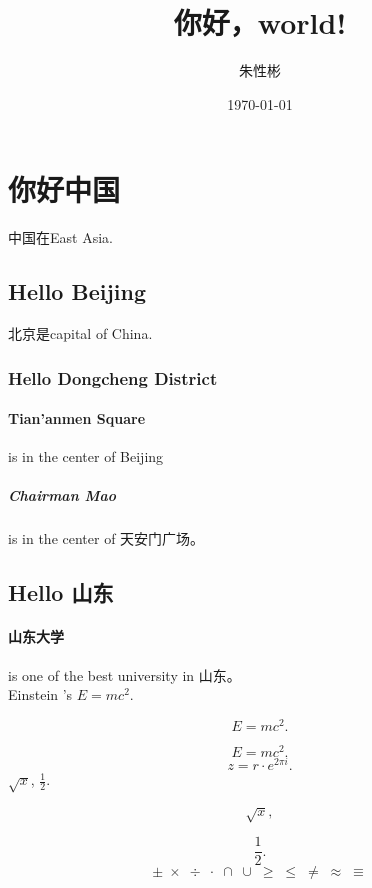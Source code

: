 \documentclass[UTF8]{ctexart}
\title{你好，world!}
\author{朱性彬}
\date{\today}
\begin{document}
\maketitle
\tableofcontents
\section{你好中国}%
中国在East Asia.
	\subsection{Hello Beijing}%
北京是capital of China.
	\subsubsection{Hello Dongcheng District}%
	\paragraph{Tian'anmen Square}%
		is in the center of Beijing
		\subparagraph{Chairman Mao}%
		is in the center of 天安门广场。
	\subsection{Hello 山东}
	\paragraph{山东大学} is one of the best university in 山东。\\
Einstein 's   $E=mc^2$.

\[ E=mc^2. \]

\begin{equation*}
E=mc^2.
\end{equation*}
\[ z = r\cdot e^{2\pi i}. \]
$\sqrt{x}$, $\frac{1}{2}$.

\[ \sqrt{x}, \]

\[ \frac{1}{2}. \]
\[ \pm\; \times \; \div\; \cdot\; \cap\; \cup\;
\geq\; \leq\; \neq\; \approx \; \equiv \]
\end{document}
